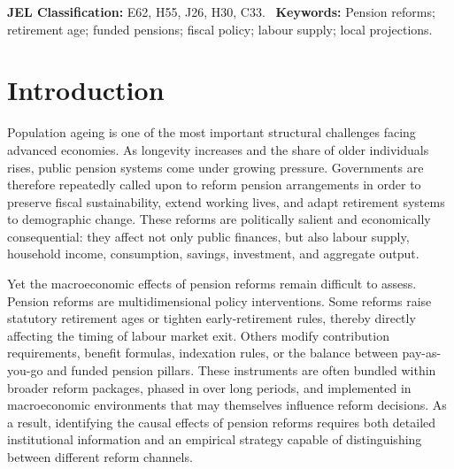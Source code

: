 \documentclass[11pt,english,a4paper, twoside, authoryear]{article}
\begin{document}
\noindent \textbf{JEL Classification:} E62, H55, J26, H30, C33. \
\noindent \textbf{Keywords:} Pension reforms; retirement age; funded pensions; fiscal policy; labour supply; local projections.

\thispagestyle{empty}

\newpage

\section{Introduction}




Population ageing is one of the most important structural challenges facing advanced economies. As longevity increases and the share of older individuals rises, public pension systems come under growing pressure. Governments are therefore repeatedly called upon to reform pension arrangements in order to preserve fiscal sustainability, extend working lives, and adapt retirement systems to demographic change. These reforms are politically salient and economically consequential: they affect not only public finances, but also labour supply, household income, consumption, savings, investment, and aggregate output.

Yet the macroeconomic effects of pension reforms remain difficult to assess. Pension reforms are multidimensional policy interventions. Some reforms raise statutory retirement ages or tighten early-retirement rules, thereby directly affecting the timing of labour market exit. Others modify contribution requirements, benefit formulas, indexation rules, or the balance between pay-as-you-go and funded pension pillars. These instruments are often bundled within broader reform packages, phased in over long periods, and implemented in macroeconomic environments that may themselves influence reform decisions. As a result, identifying the causal effects of pension reforms requires both detailed institutional information and an empirical strategy capable of distinguishing between different reform channels.
\end{document}
